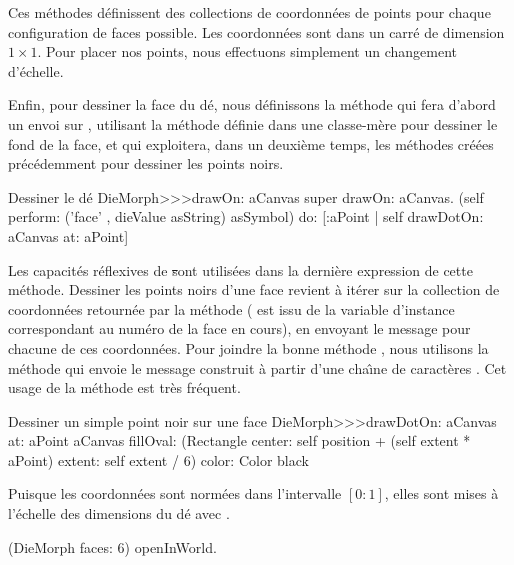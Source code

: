 \documentclass[a4paper,10pt,twoside]{book}
\begin{document}
Ces m\'ethodes d\'efinissent des collections de coordonn\'ees de
points pour chaque configuration de faces possible. Les coordonn\'ees
sont dans un carr\'e de dimension $1\times1$. Pour placer nos points,
nous effectuons simplement un changement d'\'echelle.

Enfin, pour dessiner la face du d\'e, nous d\'efinissons la m\'ethode
 qui fera d'abord un envoi sur , utilisant la m\'ethode
d\'efinie dans une classe-m\`ere pour dessiner le fond de la face, et
qui exploitera, dans un deuxi\`eme temps, les m\'ethodes cr\'e\'ees
pr\'ec\'edemment pour dessiner les points noirs.

\begin{method}{Dessiner le d\'e}
DieMorph>>>drawOn: aCanvas
	super drawOn: aCanvas.
	(self perform: ('face' , dieValue asString) asSymbol)
		do: [:aPoint | self drawDotOn: aCanvas at: aPoint]
\end{method}

Les capacit\'es r\'eflexives de \st sont utilis\'ees dans la
derni\`ere expression de cette m\'ethode. Dessiner les points noirs
d'une face revient \`a it\'erer sur la collection 
de coordonn\'ees retourn\'ee par la m\'ethode  
( est issu de la variable d'instance 
correspondant au num\'ero de la face en cours),
en envoyant le message  pour chacune de ces
coordonn\'ees. Pour joindre la bonne m\'ethode %
, nous utilisons la m\'ethode  qui
envoie le message construit \`a partir d'une cha\^{\i}ne de
caract\`eres .
Cet usage de la m\'ethode  est tr\`es fr\'equent.

\begin{method}{Dessiner un simple point noir sur une face}
DieMorph>>>drawDotOn: aCanvas at: aPoint
	aCanvas
		fillOval: (Rectangle
			center: self position + (self extent * aPoint)
			extent: self extent / 6)
		color: Color black
\end{method}

Puisque les coordonn\'ees sont norm\'ees dans l'intervalle $[0{:}1]$,
elles sont mises \`a l'\'echelle des dimensions du d\'e avec 
.

\begin{code}{}
(DieMorph faces: 6) openInWorld.
\end{code}
\end{document}
